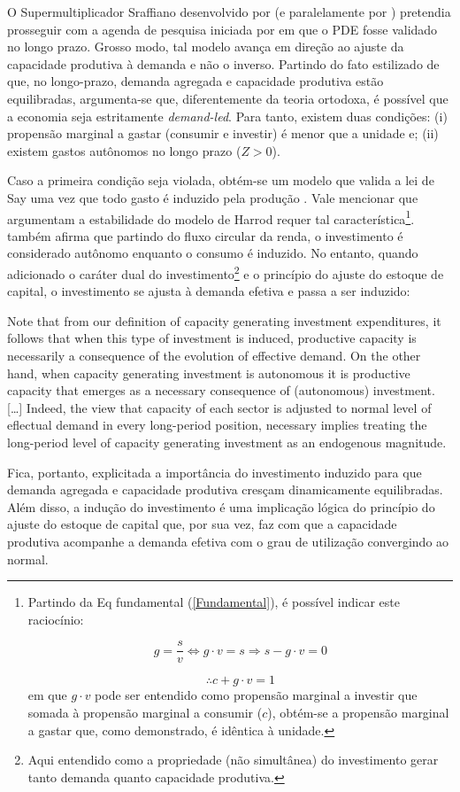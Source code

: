 O Supermultiplicador Sraffiano desenvolvido por \textcite{serrano_sraffian_1995} (e paralelamente por \textcite{bortis_institutions_1996}) pretendia prosseguir com a agenda de pesquisa iniciada por \textcite[Original de 1962]{garegnani_problem_2015} em que o PDE fosse validado no longo prazo.  Grosso modo, tal modelo avança em direção ao ajuste da capacidade produtiva à demanda e não o inverso.
Partindo do fato estilizado de que, no longo-prazo, demanda agregada e capacidade produtiva estão equilibradas, argumenta-se que, diferentemente da teoria ortodoxa, é possível que a economia seja estritamente \textit{demand-led}. Para tanto, existem duas condições: (i) propensão marginal a gastar (consumir e investir) é menor que a unidade e; (ii) existem gastos autônomos no longo prazo ($Z > 0$).

Caso a primeira condição seja violada, obtém-se um modelo que valida a lei de Say uma vez que todo gasto é induzido pela produção \cite[p.~ 75]{serrano_sraffian_1995}. Vale mencionar que \textcite{serrano_trouble_2017} argumentam a estabilidade do modelo de Harrod requer tal característica\footnote{Partindo da Eq fundamental (\ref{Fundamental}), é possível indicar este raciocínio:

$$
g = \frac{s}{v} \Leftrightarrow g\cdot v = s \Rightarrow s - g\cdot v = 0
$$

$$
\therefore c + g\cdot v = 1
$$
em que $g\cdot v$ pode ser entendido como propensão marginal a investir que somada à propensão marginal a consumir ($c$), obtém-se a propensão marginal a gastar que, como demonstrado, é idêntica à unidade.}. \textcite{serrano_long_1995} também afirma que partindo do fluxo circular da renda, o investimento é considerado autônomo enquanto o consumo é induzido. No entanto, quando adicionado o caráter dual do investimento\footnote{Aqui entendido  como a propriedade (não simultânea) do investimento gerar tanto demanda quanto capacidade produtiva.} e o princípio do ajuste do estoque de capital, o investimento se ajusta à demanda efetiva e passa a ser induzido:

\begin{citacao}
Note that from our definition of capacity generating investment expenditures, it follows that when this type of investment is induced, productive capacity is necessarily a consequence of the evolution of effective demand. On the other hand, when capacity generating investment is autonomous it is productive capacity that emerges as a necessary consequence of (autonomous) investment. […] Indeed, the view that capacity of each sector is adjusted to normal level of eflectual demand in every long-period position, necessary implies treating the long-period level of capacity generating investment as an endogenous magnitude. \cite[p.~77]{serrano_sraffian_1995}
\end{citacao}
Fica, portanto, explicitada a importância do investimento induzido para que demanda agregada e capacidade produtiva cresçam dinamicamente equilibradas. Além disso, a indução do investimento é uma implicação lógica do princípio do ajuste do estoque de capital que, por sua vez, faz com que a capacidade produtiva acompanhe a demanda efetiva com o grau de utilização convergindo ao normal.


